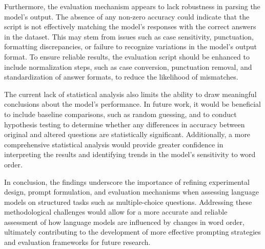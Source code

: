 \documentclass{article}
\begin{document}
Furthermore, the evaluation mechanism appears to lack robustness in parsing the model's output. The absence of any non-zero accuracy could indicate that the script is not effectively matching the model's responses with the correct answers in the dataset. This may stem from issues such as case sensitivity, punctuation, formatting discrepancies, or failure to recognize variations in the model's output format. To ensure reliable results, the evaluation script should be enhanced to include normalization steps, such as case conversion, punctuation removal, and standardization of answer formats, to reduce the likelihood of mismatches.

The current lack of statistical analysis also limits the ability to draw meaningful conclusions about the model's performance. In future work, it would be beneficial to include baseline comparisons, such as random guessing, and to conduct hypothesis testing to determine whether any differences in accuracy between original and altered questions are statistically significant. Additionally, a more comprehensive statistical analysis would provide greater confidence in interpreting the results and identifying trends in the model's sensitivity to word order.

In conclusion, the findings underscore the importance of refining experimental design, prompt formulation, and evaluation mechanisms when assessing language models on structured tasks such as multiple-choice questions. Addressing these methodological challenges would allow for a more accurate and reliable assessment of how language models are influenced by changes in word order, ultimately contributing to the development of more effective prompting strategies and evaluation frameworks for future research.
\end{document}
